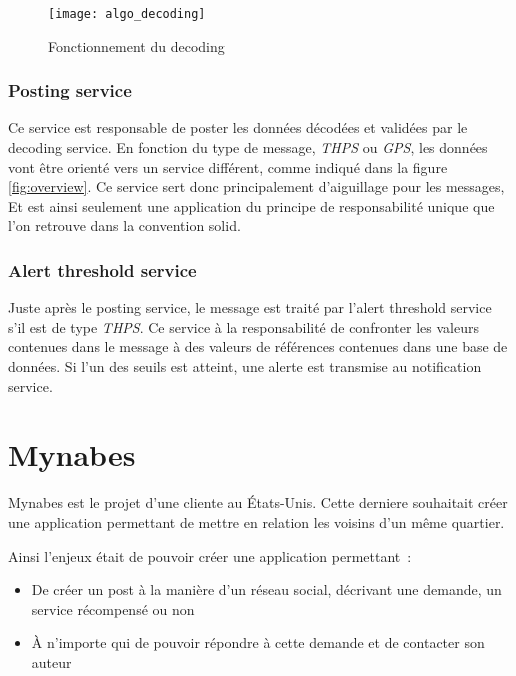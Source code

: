 \documentclass[../rapport.tex]{subfiles}
\begin{document}
        \begin{figure}
            \centering
            \texttt{[image: algo\_decoding]}
            \caption{Fonctionnement du decoding}\label{fig:algo_decoding}
        \end{figure}

        \subsubsection{Posting service}
        Ce service est responsable de poster les données décodées et validées par le decoding service.
        En fonction du type de message, \textit{THPS} ou \textit{GPS}, les données vont être orienté vers un service différent,
        comme indiqué dans la figure \ref{fig:overview}. Ce service sert donc principalement d'aiguillage pour les messages,
        Et est ainsi seulement une application du principe de responsabilité unique que l'on retrouve dans la convention \gls{solid}.

        \subsubsection{Alert threshold service}
        Juste après le posting service, le message est traité par l'alert threshold service s'il est de type \textit{THPS}.
        Ce service à la responsabilité de confronter les valeurs contenues dans le message à des valeurs de références contenues dans
        une base de données. Si l'un des seuils est atteint, une alerte est transmise au notification service.

        \section{Mynabes}\label{subsec:mynabes}
        Mynabes est le projet d'une cliente au États-Unis.
        Cette derniere souhaitait créer une application 
        permettant de mettre en relation les voisins d'un
        même quartier.

        Ainsi l'enjeux était de pouvoir créer une application permettant~:
        \begin{itemize}
            \item De créer un post à la manière d'un réseau social, décrivant une demande, un service récompensé ou non
            \item À n'importe qui de pouvoir répondre à 
                cette demande et de contacter son auteur
        \end{itemize}
\end{document}
